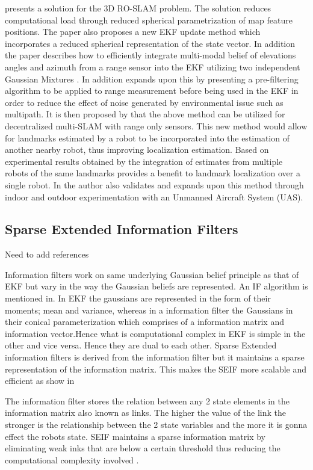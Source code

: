 \documentclass[conference]{IEEEtran}
\begin{document}
	\cite{Fabresse2013} presents a solution for the 3D RO-SLAM problem. The solution reduces computational load through reduced spherical parametrization of map feature positions. The paper also proposes a new EKF update method which incorporates a reduced spherical representation of the state vector. In addition the paper describes how to efficiently integrate multi-modal belief of elevations angles and azimuth from a range sensor into the EKF utilizing two independent Gaussian Mixtures \cite{Fabresse2013}. In addition \cite{Fabresse2014} expands upon this by presenting a pre-filtering algorithm to be applied to range measurement before being used in the EKF in order to reduce the effect of noise generated by environmental issue such as multipath. It is then proposed by \cite{Fabresse2015} that the above method can be utilized for decentralized multi-SLAM with range only sensors. This new method would allow for landmarks estimated by a robot to be incorporated into the estimation of another nearby robot, thus improving localization estimation. Based on experimental results obtained by \cite{Fabresse2015} the integration of estimates from multiple robots of the same landmarks provides a benefit to landmark localization over a single robot. In \cite{Fabresse2016} the author also validates and expands upon this method through indoor and outdoor experimentation with an Unmanned Aircraft System (UAS).  
	
\subsection{Sparse Extended Information Filters}
Need to add references

Information filters work on same underlying Gaussian belief principle as that of EKF but vary in the way the Gaussian beliefs are represented. An IF algorithm is mentioned in\cite{Torres-Gonzalez2014}. In EKF the gaussians are represented in the form of their moments; mean and variance, whereas in a information filter the Gaussians in their conical parameterization which comprises of a information matrix and information vector.Hence what is computational complex in EKF is simple in the other and vice versa. Hence they are dual to each other.
Sparse Extended information filters is derived from the  information filter but it maintains a sparse representation of the information matrix. This makes the SEIF more scalable and efficient as show in\cite{Torres-Gonzalez2014} 

The information filter stores the relation between any 2 state elements in the information matrix also known as links. The higher the value of the link the stronger is the relationship between the 2 state variables and the more it is gonna effect the robots state. SEIF maintains a sparse information matrix by eliminating weak inks that are below a certain threshold thus reducing the computational complexity involved .
\end{document}
